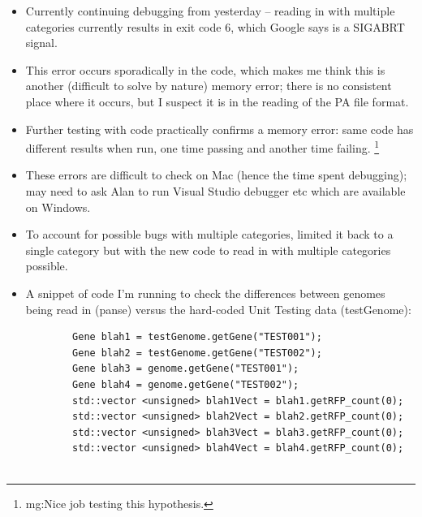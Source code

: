 \documentclass[12pt,hyperref]{labbook}
\begin{document}
\begin{itemize}
    \item Currently continuing debugging from yesterday -- reading in with multiple categories currently results in exit code 6, which Google says is a SIGABRT signal.
    \item This error occurs sporadically in the code, which makes me think this is another (difficult to solve by nature) memory error; there is no consistent place where it occurs, but I suspect it is in the reading of the PA file format.
    \item Further testing with code practically confirms a memory error: same code has different results when run, one time passing and another time failing.
\footnote{mg:Nice job testing this hypothesis.}
    \item These errors are difficult to check on Mac (hence the time spent debugging); may need to ask Alan to run Visual Studio debugger etc which are available on Windows.
	\item To account for possible bugs with multiple categories, limited it back to a single category but with the new code to read in with multiple categories possible.
    \item A snippet of code I'm running to check the differences between genomes being read in (panse) versus the hard-coded Unit Testing data (testGenome):
    \begin{lstlisting}
     	Gene blah1 = testGenome.getGene("TEST001");
        Gene blah2 = testGenome.getGene("TEST002");
        Gene blah3 = genome.getGene("TEST001");
        Gene blah4 = genome.getGene("TEST002");
        std::vector <unsigned> blah1Vect = blah1.getRFP_count(0);
        std::vector <unsigned> blah2Vect = blah2.getRFP_count(0);
        std::vector <unsigned> blah3Vect = blah3.getRFP_count(0);
        std::vector <unsigned> blah4Vect = blah4.getRFP_count(0);


\end{lstlisting}
\end{itemize}
\end{document}
